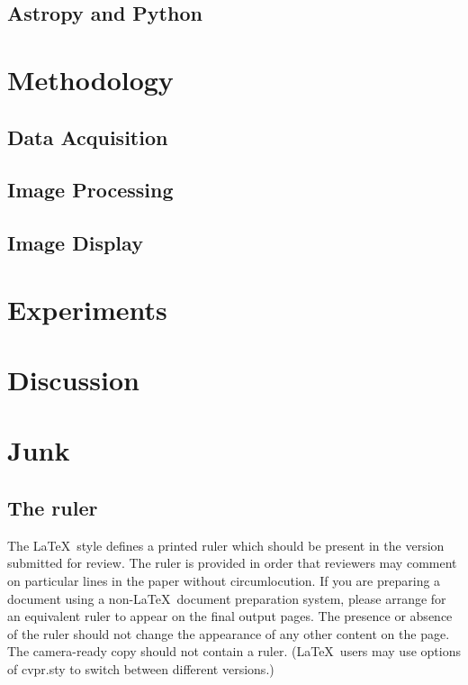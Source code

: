 \documentclass[10pt,twocolumn,letterpaper]{article}
\begin{document}
\subsection{Astropy and Python}

\section{Methodology}
\label{sec:script}
\subsection{Data Acquisition}
\subsection{Image Processing}
\subsection{Image Display}

\section{Experiments}
\label{sec:exp}

\section{Discussion}
\label{sec:disc}

\section{Junk}
\label{sec:xxx}

\subsection{The ruler}
The \LaTeX\ style defines a printed ruler which should be present in the version submitted for review.
The ruler is provided in order that reviewers may comment on particular lines in the paper without circumlocution.
If you are preparing a document using a non-\LaTeX\ document preparation system, please arrange for an equivalent ruler to appear on the final output pages.
The presence or absence of the ruler should not change the appearance of any other content on the page.
The camera-ready copy should not contain a ruler.
(\LaTeX\ users may use options of cvpr.sty to switch between different versions.)
\end{document}
